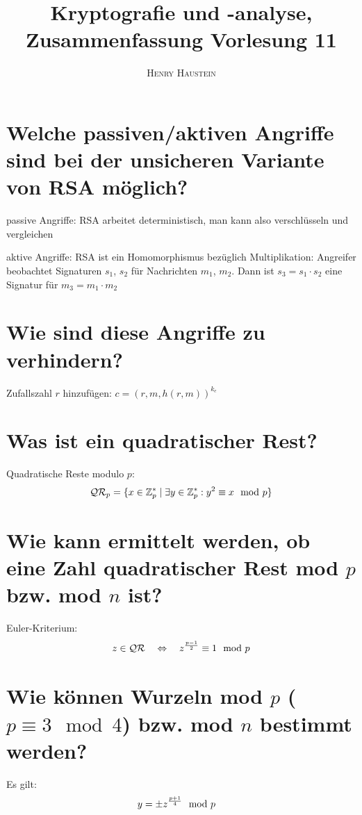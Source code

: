 \documentclass{article}
\title{\textbf{Kryptografie und -analyse, Zusammenfassung Vorlesung 11}}
\author{\textsc{Henry Haustein}}
\date{}
\begin{document}
	\maketitle
	
	\section*{Welche passiven/aktiven Angriffe sind bei der unsicheren Variante von RSA möglich?}
	passive Angriffe: RSA arbeitet deterministisch, man kann also verschlüsseln und vergleichen
	
	aktive Angriffe: RSA ist ein Homomorphismus bezüglich Multiplikation: Angreifer beobachtet Signaturen $s_1$, $s_2$ für Nachrichten $m_1$, $m_2$. Dann ist $s_3 = s_1\cdot s_2$ eine Signatur für $m_3 = m_1\cdot m_2$
	
	\section*{Wie sind diese Angriffe zu verhindern?}
	Zufallszahl $r$ hinzufügen: $c = (r,m, h(r, m))^{k_e}$
	
	\section*{Was ist ein quadratischer Rest?}
	Quadratische Reste modulo $p$:
	\begin{align}
		\mathcal{QR}_p = \{x\in \mathbb{Z}_p^\ast \mid \exists y\in \mathbb{Z}_p^\ast: y^2 \equiv x\mod p\} \notag
	\end{align}
	
	\section*{Wie kann ermittelt werden, ob eine Zahl quadratischer Rest mod $p$ bzw. mod $n$ ist?}
	Euler-Kriterium:
	\begin{align}
		z\in\mathcal{QR} \quad\Leftrightarrow\quad z^{\frac{p-1}{2}} \equiv 1\mod p\notag
	\end{align}
	
	\section*{Wie können Wurzeln mod $p$ ($p \equiv 3 \mod 4$) bzw. mod $n$ bestimmt werden?}
	Es gilt:
	\begin{align}
		y &= \pm z^{\frac{p+1}{4}} \mod p\notag
	\end{align}
	
\end{document}
